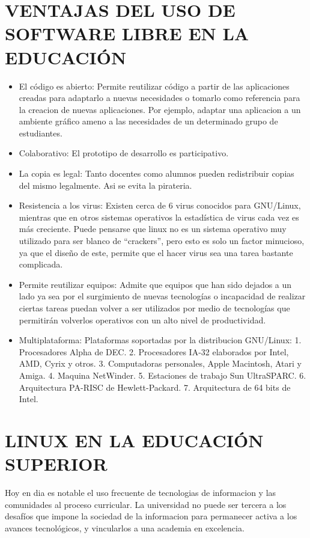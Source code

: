 \section*{VENTAJAS DEL USO DE SOFTWARE LIBRE EN LA EDUCACIÓN}
\begin{itemize}
  \item El código es abierto: Permite reutilizar código a partir de
	las aplicaciones creadas para adaptarlo a nuevas
	necesidades o tomarlo como referencia para la creacion
	de nuevas aplicaciones. Por ejemplo, adaptar una
	aplicacion a un ambiente gráfico ameno a las necesidades
	de un determinado grupo de estudiantes.
  \item Colaborativo: El prototipo de desarrollo es participativo.
  \item La copia es legal: Tanto docentes como alumnos pueden
	redistribuir copias del mismo legalmente. Asi se evita la
	pirateria.
  \item Resistencia a los virus: Existen cerca de 6 virus conocidos
	para GNU/Linux, mientras que en otros sistemas
	operativos la estadística de virus cada vez es más
	creciente. Puede pensarse que linux no es un sistema
	operativo muy utilizado para ser blanco de “crackers”,
	pero esto es solo un factor minucioso, ya que el diseño de
	este, permite que el hacer virus sea una tarea bastante
	complicada.
  \item Permite reutilizar equipos: Admite que equipos que han
	sido dejados a un lado ya sea por el surgimiento de
	nuevas tecnologías o incapacidad de realizar ciertas
	tareas puedan volver a ser utilizados por medio de
	tecnologías que permitirán volverlos operativos con un
	alto nivel de productividad.
  \item Multiplataforma: Plataformas soportadas por la
	distribucion GNU/Linux:
	1. Procesadores Alpha de DEC.
	2. Procesadores IA-32 elaborados por Intel, AMD, Cyrix y otros.
	3. Computadoras personales, Apple Macintosh, Atari y Amiga.
	4. Maquina NetWinder.
	5. Estaciones de trabajo Sun UltraSPARC.
	6. Arquitectura PA-RISC de Hewlett-Packard.
	7. Arquitectura de 64 bits de Intel.
\end{itemize}

\section*{LINUX EN LA EDUCACIÓN SUPERIOR}
Hoy en dia es notable el uso frecuente de tecnologias de
informacion y las comunidades al proceso curricular. La
universidad no puede ser tercera a los desafíos que impone la
sociedad de la informacion para permanecer activa a los avances
tecnológicos, y vincularlos a una academia en excelencia.

